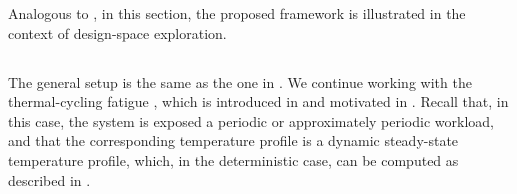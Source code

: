 Analogous to , in this section, the proposed framework
is illustrated in the context of design-space exploration.

\subsection{\problemtitle}

The general setup is the same as the one in .
We continue working with the thermal-cycling fatigue \cite{jedec2016}, which is
introduced in  and motivated in
. Recall that, in this case, the system is exposed a
periodic or approximately periodic workload, and that the corresponding
temperature profile is a dynamic steady-state temperature profile, which, in the
deterministic case, can be computed as described in
.

